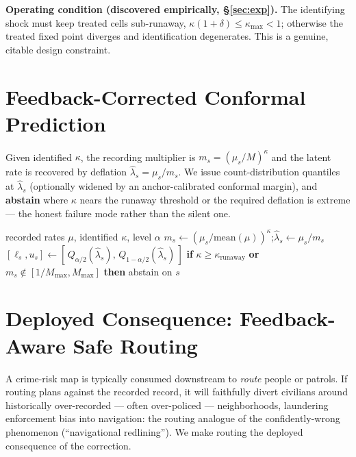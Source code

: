 \documentclass[10pt]{article}
\begin{document}
\noindent\textbf{Operating condition (discovered empirically, \S\ref{sec:exp}).}
The identifying shock must keep treated cells sub-runaway,
$\kappa(1+\delta)\le \kappa_{\max}<1$; otherwise the treated fixed point diverges
and identification degenerates. This is a genuine, citable design constraint.

\section{Feedback-Corrected Conformal Prediction}
\label{sec:correct}

Given identified $\kappa$, the recording multiplier is $m_s=(\mu_s/M)^\kappa$ and
the latent rate is recovered by deflation $\hat\lambda_s=\mu_s/m_s$. We issue
count-distribution quantiles at $\hat\lambda_s$ (optionally widened by an
anchor-calibrated conformal margin), and \textbf{abstain} where $\kappa$ nears
the runaway threshold or the required deflation is extreme --- the honest failure
mode rather than the silent one.

\begin{algorithm}[h]
\caption{Feedback-corrected latent interval}
\begin{algorithmic}[1]
\REQUIRE recorded rates $\mu$, identified $\kappa$, level $\alpha$
\STATE $m_s \leftarrow (\mu_s/\text{mean}(\mu))^\kappa$;\quad $\hat\lambda_s \leftarrow \mu_s/m_s$
\STATE $[\ell_s,u_s]\leftarrow[\,Q_{\alpha/2}(\hat\lambda_s),\,Q_{1-\alpha/2}(\hat\lambda_s)\,]$
\STATE \textbf{if} $\kappa\ge\kappa_{\text{runaway}}$ \textbf{or} $m_s\notin[1/M_{\max},M_{\max}]$ \textbf{then} abstain on $s$
\end{algorithmic}
\end{algorithm}

\section{Deployed Consequence: Feedback-Aware Safe Routing}
\label{sec:routing}

A crime-risk map is typically consumed downstream to \emph{route} people or
patrols. If routing plans against the recorded record, it will faithfully divert
civilians around historically over-recorded --- often over-policed ---
neighborhoods, laundering enforcement bias into navigation: the routing analogue
of the confidently-wrong phenomenon (``navigational redlining''). We make routing
the deployed consequence of the correction.
\end{document}
